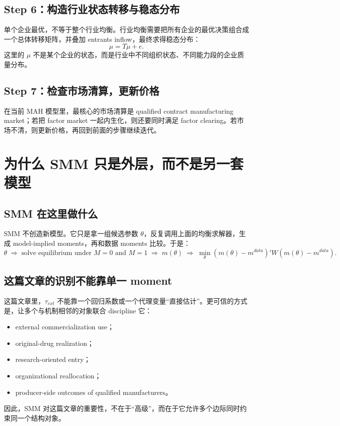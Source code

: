 \documentclass[12pt]{ctexart}
\newcommand{\tauext}{\tau_{ext}}
\begin{document}
\subsection{Step 6：构造行业状态转移与稳态分布}
单个企业最优，不等于整个行业均衡。行业均衡需要把所有企业的最优决策组合成一个总体转移矩阵，并叠加 entrants inflow，最终求得稳态分布：
\[
\mu = T\mu + e.
\]
这里的 $\mu$ 不是某个企业的状态，而是行业中不同组织状态、不同能力段的企业质量分布。

\subsection{Step 7：检查市场清算，更新价格}
在当前 MAH 模型里，最核心的市场清算是 qualified contract manufacturing market；若把 factor market 一起内生化，则还要同时满足 factor clearing。若市场不清，则更新价格，再回到前面的步骤继续迭代。

\section{为什么 SMM 只是外层，而不是另一套模型}

\subsection{SMM 在这里做什么}
SMM 不创造新模型。它只是拿一组候选参数 $\theta$，反复调用上面的均衡求解器，生成 model-implied moments，再和数据 moments 比较。于是：
\[
\theta
\;\Longrightarrow\;
\text{solve equilibrium under }M=0\text{ and }M=1
\;\Longrightarrow\;
m(\theta)
\;\Longrightarrow\;
\min_{\theta} (m(\theta)-m^{data})'W(m(\theta)-m^{data}).
\]

\subsection{这篇文章的识别不能靠单一 moment}
这篇文章里，\(\tauext\) 不能靠一个回归系数或一个代理变量“直接估计”。更可信的方式是，让多个与机制相邻的对象联合 discipline 它：
\begin{itemize}[leftmargin=2em]
    \item external commercialization use；
    \item original-drug realization；
    \item research-oriented entry；
    \item organizational reallocation；
    \item producer-side outcomes of qualified manufacturers。
\end{itemize}
因此，SMM 对这篇文章的重要性，不在于“高级”，而在于它允许多个边际同时约束同一个结构对象。
\end{document}

